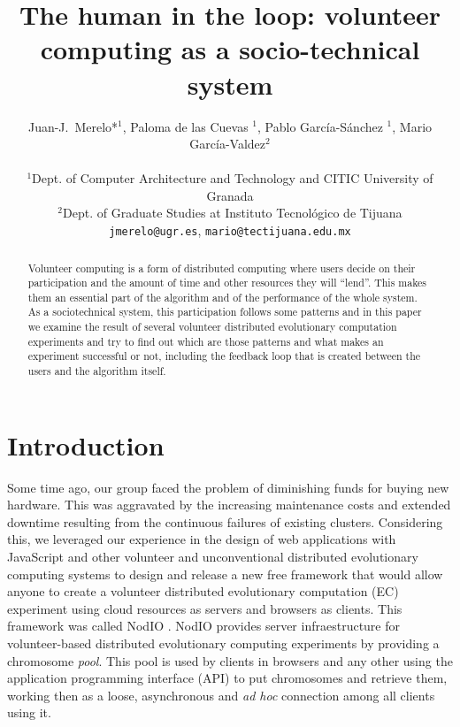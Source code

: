 \documentclass[letterpaper]{article}
\title{The human in the loop: volunteer computing as a socio-technical
system}
\author{Juan-J.~Merelo*$^1$, Paloma de las Cuevas $^1$, Pablo
  Garc\'ia-S\'anchez $^1$, Mario Garc\'ia-Valdez$^2$\\
\mbox{}\\
$^1$Dept. of Computer Architecture and Technology and CITIC University of Granada \\
$^2$Dept. of Graduate Studies at Instituto Tecnol\'ogico de Tijuana \\
{\tt jmerelo@ugr.es}, {\tt mario@tectijuana.edu.mx}}
\begin{document}
\maketitle

\begin{abstract}
Volunteer computing is a form of distributed computing where users
decide on their participation and the amount of time and other resources they will
``lend''. This makes them an essential part of the algorithm and of
the performance of the whole system. As a sociotechnical system, this
participation follows some patterns and in this paper we examine the
result of several volunteer distributed evolutionary computation
experiments and try to find out which are those patterns and what
makes an experiment successful or not, including the feedback loop
that is created between the users and the algorithm itself.
\end{abstract}

\section{Introduction}
\label{introduction}

Some time ago, our group faced the problem of diminishing funds for
buying new hardware. This was aggravated by the increasing maintenance
costs and extended downtime resulting from the continuous failures of
existing clusters.  Considering this, we leveraged our experience in
the design of web applications with JavaScript and other volunteer and
unconventional distributed evolutionary computing systems to design
and release a new free framework that would allow anyone to create a
volunteer distributed evolutionary computation (EC) experiment using
cloud resources as servers and browsers as clients. This framework was
called NodIO \citep{2016arXiv160101607M}. NodIO provides server
infraestructure for volunteer-based distributed evolutionary computing
experiments by providing a chromosome {\em pool}. This pool is used by
clients in browsers and any other using the application programming
interface (API) to put chromosomes and retrieve them, working then as
a loose, asynchronous and {\em ad hoc} connection among all clients
using it. 
\end{document}
